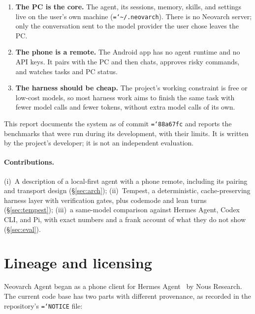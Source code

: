 \documentclass[11pt]{article}
\newcommand{\code}[1]{\texttt{\hyphenchar\font=`\-\relax #1}}
\begin{document}
\begin{enumerate}
\item \textbf{The PC is the core.} The agent, its sessions, memory, skills, and settings live on the user's own machine
  (\code{\textasciitilde/.neovarch}). There is no Neovarch server; only the conversation sent to the model provider the user chose leaves the PC.
\item \textbf{The phone is a remote.} The Android app has no agent runtime and no API keys. It pairs with the PC and then chats,
  approves risky commands, and watches tasks and PC status.
\item \textbf{The harness should be cheap.} The project's working constraint is free or low-cost models, so most harness
  work aims to finish the same task with fewer model calls and fewer tokens, without extra model calls of its own.
\end{enumerate}

\noindent This report documents the system as of commit \code{88a67fc} and reports the benchmarks that were run during
its development, with their limits. It is written by the project's developer; it is not an independent evaluation.

\paragraph{Contributions.}
(i)~A description of a local-first agent with a phone remote, including its pairing and transport design (\S\ref{sec:arch});
(ii)~Tempest, a deterministic, cache-preserving harness layer with verification gates, plus codemode and lean turns (\S\ref{sec:tempest});
(iii)~a same-model comparison against Hermes Agent, Codex CLI, and Pi, with exact numbers and a frank account of what they do not show (\S\ref{sec:eval}).

\section{Lineage and licensing}
\label{sec:lineage}

Neovarch Agent began as a phone client for Hermes Agent~\citep{hermesagent} by Nous Research. The current code base has
two parts with different provenance, as recorded in the repository's \code{NOTICE} file:
\end{document}
